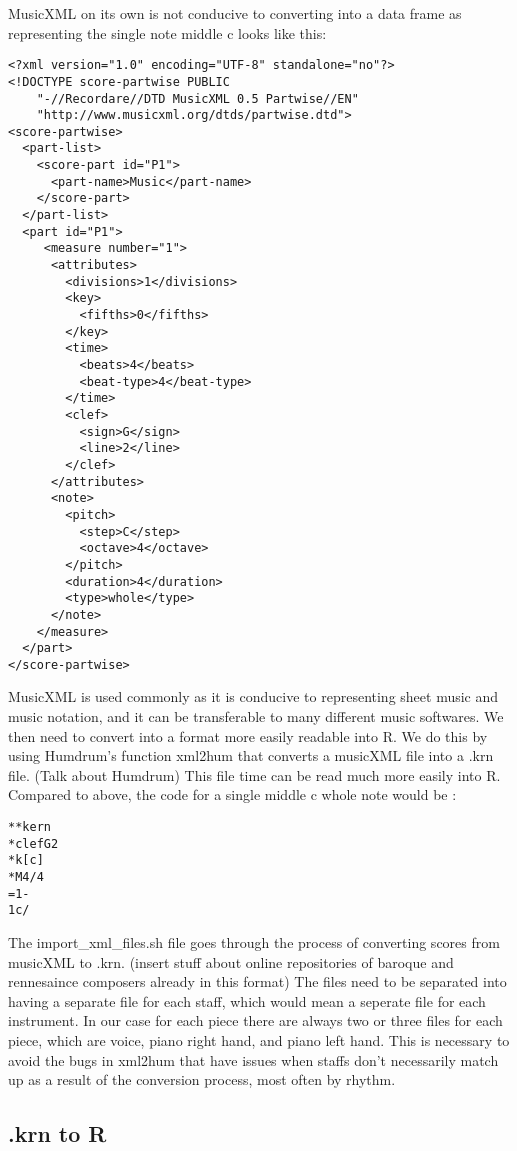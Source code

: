 \documentclass[12pt,twoside]{reedthesis}
\theoremstyle{definition}
\theoremstyle{definition}
\theoremstyle{definition}
\theoremstyle{remark}
\begin{document}
MusicXML on its own is not conducive to converting into a data frame as
representing the single note middle c looks like this:
\begin{verbatim}
<?xml version="1.0" encoding="UTF-8" standalone="no"?>
<!DOCTYPE score-partwise PUBLIC
    "-//Recordare//DTD MusicXML 0.5 Partwise//EN"
    "http://www.musicxml.org/dtds/partwise.dtd">
<score-partwise>
  <part-list>
    <score-part id="P1">
      <part-name>Music</part-name>
    </score-part>
  </part-list>
  <part id="P1">
     <measure number="1">
      <attributes>
        <divisions>1</divisions>
        <key>
          <fifths>0</fifths>
        </key>
        <time>
          <beats>4</beats>
          <beat-type>4</beat-type>
        </time>
        <clef>
          <sign>G</sign>
          <line>2</line>
        </clef>
      </attributes>
      <note>
        <pitch>
          <step>C</step>
          <octave>4</octave>
        </pitch>
        <duration>4</duration>
        <type>whole</type>
      </note>
    </measure>
  </part>
</score-partwise> 
\end{verbatim}
MusicXML is used commonly as it is conducive to representing sheet music
and music notation, and it can be transferable to many different music
softwares. We then need to convert into a format more easily readable
into R. We do this by using Humdrum's function xml2hum that converts a
musicXML file into a .krn file. (Talk about Humdrum) This file time can
be read much more easily into R. Compared to above, the code for a
single middle c whole note would be :
\begin{verbatim}
**kern
*clefG2
*k[c]
*M4/4
=1-
1c/
\end{verbatim}
The import\_xml\_files.sh file goes through the process of converting
scores from musicXML to .krn. (insert stuff about online repositories of
baroque and rennesaince composers already in this format) The files need
to be separated into having a separate file for each staff, which would
mean a seperate file for each instrument. In our case for each piece
there are always two or three files for each piece, which are voice,
piano right hand, and piano left hand. This is necessary to avoid the
bugs in xml2hum that have issues when staffs don't necessarily match up
as a result of the conversion process, most often by rhythm.

\subsection{.krn to R}\label{krn-to-r}
\end{document}
